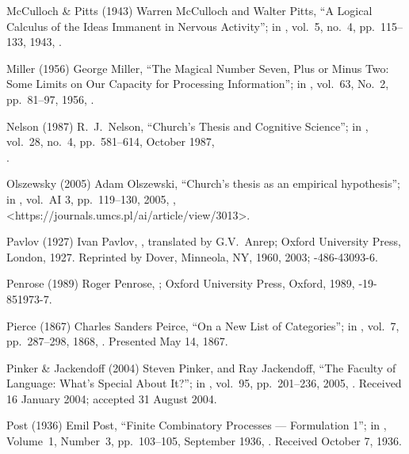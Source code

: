  McCulloch \& Pitts (1943)
Warren McCulloch and Walter Pitts,
``A Logical Calculus of the Ideas Immanent in Nervous Activity'';
in ,
vol.\ 5, no.\ 4, pp.\ 115--133, 1943,
.

 Miller (1956)
 George Miller,
``The Magical Number Seven, Plus or Minus Two:
Some Limits on Our Capacity for Processing Information'';
in ,
vol.\ 63, No.\ 2, pp.\ 81--97, 1956,
.

 Nelson (1987)
R.\ J.\ Nelson,
``Church's Thesis and Cognitive Science'';
in ,
vol.\ 28, no.\ 4, pp.\ 581--614, October 1987,\\
.

 Olszewsky (2005)
Adam Olszewski,
``Church's thesis as an empirical hypothesis'';
in ,
vol.\ AI 3, pp.\ 119--130, 2005,
,
\URL<https://journals.umcs.pl/ai/article/view/3013>.

 Pavlov (1927)
Ivan Pavlov,
,
translated by G.V.\ Anrep;
Oxford University Press, London, 1927.
Reprinted by Dover, Minneola, NY, 1960, 2003;
-486-43093-6.

 Penrose (1989)
Roger Penrose, \negthinspace
{};
Oxford University Press, Oxford, 1989,
-19-851973-7.

 Pierce (1867)
Charles Sanders Peirce,
``On a New List of Categories'';
in ,
vol.\ 7, pp.\ 287--298, 1868,
.
Presented May 14, 1867.

 Pinker \& Jackendoff (2004)
Steven Pinker, and Ray Jackendoff,
``The Faculty of Language: What’s Special About It?'';
in ,
vol.\ 95, pp.\ 201--236, 2005,
.
Received 16 January 2004; accepted 31 August 2004.

 Post (1936)
Emil Post,
``Finite Combinatory Processes --- Formulation 1'';
in ,
Volume\ 1, Number\ 3, pp.~103--105, September 1936,
.
Received October 7, 1936.

